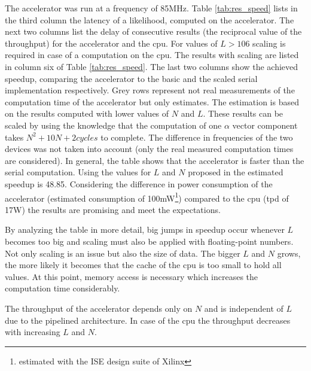 \documentclass[mscthesis]{usiinfthesis}
\begin{document}
The accelerator was run at a frequency of 85MHz. Table \ref{tab:res_speed}
lists in the third column the latency of a likelihood, computed on the
accelerator. The next two columns list the delay of consecutive results (the
reciprocal value of the throughput) for the accelerator and the \gls{cpu}. For
values of $L > 106$ scaling is required in case of a computation on the
\gls{cpu}. The results with scaling are listed in column six of Table
\ref{tab:res_speed}. The last two columns show the achieved speedup, comparing
the accelerator to the basic and the scaled serial implementation respectively.
Grey rows represent not real measurements of the computation time of the
accelerator but only estimates. The estimation is based on the results computed
with lower values of $N$ and $L$. These results can be scaled by using the
knowledge that the computation of one $\alpha$ vector component takes $N^2
+ 10N +2 cycles$ to complete. The difference in frequencies of the two devices
was not taken into account (only the real measured computation times are
considered). In general, the table shows that the accelerator is faster than
the serial computation. Using the values for $L$ and $N$ proposed in
\cite{salfner08} the estimated speedup is 48.85. Considering the difference in
power consumption of the accelerator (estimated consumption of
100mW\footnote{estimated with the ISE design suite of Xilinx}) compared to the
\gls{cpu} (\gls{tpd} of 17W) the results are promising and meet the
expectations.

By analyzing the table in more detail, big jumps in speedup occur whenever $L$
becomes too big and scaling must also be applied with floating-point numbers.
Not only scaling is an issue but also the size of data. The bigger $L$ and $N$
grows, the more likely it becomes that the cache of the \gls{cpu} is too small
to hold all values. At this point, memory access is necessary which increases
the computation time considerably.

The throughput of the accelerator depends only on $N$ and is independent of $L$
due to the pipelined architecture. In case of the \gls{cpu} the throughput
decreases with increasing $L$ and $N$.
\end{document}
